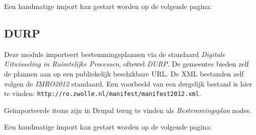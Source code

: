 Een handmatige import kan gestart worden op de volgende pagina: \\

\subsection{DURP}

Deze module importeert bestemmingsplannen via de standaard \emph{Digitale Uitwisseling in Ruimtelijke Processen}, oftewel \emph{DURP}. De gemeentes bieden zelf de plannen aan op een publiekelijk beschikbare URL. De XML bestanden zelf volgen de \emph{IMRO2012} standaard. Een voorbeeld van een dergelijk bestand is hier te vinden:
\texttt{http://ro.zwolle.nl/manifest/manifest2012.xml}.

Ge\"{i}mporteerde items zijn in Drupal terug te vinden als \emph{Bestemmingsplan} nodes.

Een handmatige import kan gestart worden op de volgende pagina: \\
